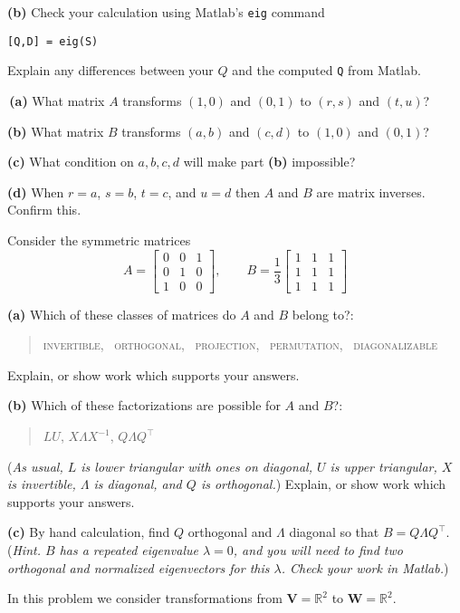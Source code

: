 \documentclass[12pt]{amsart}
\newcommand{\bV}{\bm{V}}
\newcommand{\bW}{\bm{W}}
\newcommand{\RR}{\mathbb{R}}
\newcommand{\prob}[1]{\bigskip\noindent{\large \textbf{#1.}}\quad }
\newcommand{\epart}[1]{\medskip\noindent\textbf{(#1)}\quad }
\newcommand{\ppart}[1]{\,\textbf{(#1)}\quad }
\begin{document}
\epart{b} Check your calculation using Matlab's \texttt{eig} command

\texttt{[Q,D] = eig(S)}

\noindent Explain any differences between your $Q$ and the computed \texttt{Q} from Matlab.


\prob{P58}  \ppart{a} What matrix $A$ transforms $(1,0)$ and $(0,1)$ to $(r,s)$ and $(t,u)$?

\epart{b} What matrix $B$ transforms $(a,b)$ and $(c,d)$ to $(1,0)$ and $(0,1)$?

\epart{c} What condition on $a,b,c,d$ will make part \textbf{(b)} impossible?

\epart{d} When $r=a$, $s=b$, $t=c$, and $u=d$ then $A$ and $B$ are matrix inverses.  Confirm this.


\clearpage\newpage
\prob{P59}  Consider the symmetric matrices
    $$A = \begin{bmatrix} 0 & 0 & 1 \\ 0 & 1 & 0 \\ 1 & 0 & 0 \end{bmatrix}, \qquad B = \frac{1}{3} \begin{bmatrix} 1 & 1 & 1 \\ 1 & 1 & 1 \\ 1 & 1 & 1 \end{bmatrix}$$

\epart{a}  Which of these classes of matrices do $A$ and $B$ belong to?:
\begin{quote}
{\small
\textsc{invertible, \, orthogonal, \, projection, \, permutation, \, diagonalizable}
}
\end{quote}
Explain, or show work which supports your answers.

\epart{b}  Which of these factorizations are possible for $A$ and $B$?:
\begin{quote}
$LU$, \quad $X\Lambda X^{-1}$, \quad $Q \Lambda Q^\top$
\end{quote}
(\emph{As usual, $L$ is lower triangular with ones on diagonal, $U$ is upper triangular, $X$ is invertible, $\Lambda$ is diagonal, and $Q$ is orthogonal.})  Explain, or show work which supports your answers.

\epart{c}  By hand calculation, find $Q$ orthogonal and $\Lambda$ diagonal so that $B=Q \Lambda Q^\top$.  (\emph{Hint.  $B$ has a repeated eigenvalue $\lambda=0$, and you will need to find \emph{two} orthogonal and normalized eigenvectors for this $\lambda$.  Check your work in Matlab.})


\prob{P60}  In this problem we consider transformations from $\bV=\RR^2$ to $\bW=\RR^2$.
\end{document}
